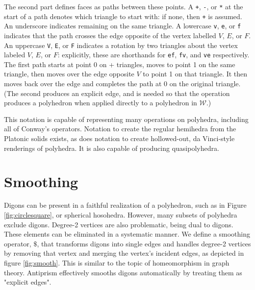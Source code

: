 \documentclass{amsart}[12pt]
\begin{document}
The second part defines faces as paths between these points. A \texttt{+},
\texttt{-}, or \texttt{*} at the start of a path denotes which triangle to
start with: if none, then \texttt{+} is assumed. An underscore indicates
remaining on the same triangle. A lowercase \texttt{v}, \texttt{e}, or
\texttt{f} indicates that the path crosses the edge opposite of the vertex
labelled $V$, $E$, or $F$. An uppercase \texttt{V}, \texttt{E}, or \texttt{F}
indicates a rotation by two triangles about the vertex labeled $V$, $E$, or $F$:
explicitly, these are shorthands for \texttt{ef}, \texttt{fv}, and \texttt{ve}
respectively. The first path starts at point 0 on + triangles, moves to point 1
on the same triangle, then moves over the edge opposite $V$ to point 1 on
that triangle. It then moves back over the edge and completes the path at 0
on the original triangle. (The second produces an explicit edge, and is needed
so that the operation produces a polyhedron when applied directly to a
polyhedron in $\mathcal{W}$.)

This notation is capable of representing many operations on polyhedra,
including all of Conway's operators. Notation to create the regular hemihedra
from the Platonic solids exists, as does notation to create hollowed-out,
da Vinci-style renderings of polyhedra.
It is also capable of producing quasipolyhedra.

\section{Smoothing}

Digons can be present in a faithful realization of a polyhedron, such as in
Figure \ref{fig:circlesquare}, or spherical hosohedra. However, many subsets of
polyhedra exclude digons. Degree-2 vertices are also problematic, being dual to
digons. These elements can be eliminated in a systematic manner. We define a
smoothing operator, $\$$, that transforms digons into single edges and handles
degree-2 vertices by removing that vertex and merging the vertex's incident
edges, as depicted in figure \ref{fig:smooth}. This is similar to the topic of
homeomorphism in graph theory. Antiprism effectively smooths digons
automatically by treating them as "explicit edges".
\end{document}
